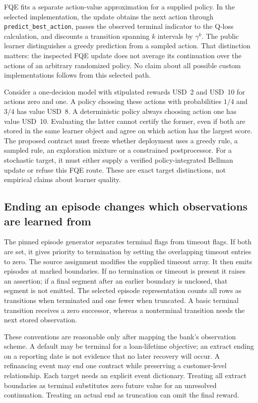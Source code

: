 FQE fits a separate action-value approximation for a supplied policy. In
the selected implementation, the update obtains the next action through
\texttt{predict_best_action}, passes the observed terminal indicator to the
Q-loss calculation, and discounts a transition spanning \(k\) intervals by
\(\gamma^k\). The public learner distinguishes a greedy prediction from a
sampled action. That distinction matters: the inspected FQE update does not
average its continuation over the actions of an arbitrary randomized policy.
No claim about all possible custom implementations follows from this selected
path. \citep{exec15_d3rlpy_value}

Consider a one-decision model with stipulated rewards USD~2 and USD~10 for
actions zero and one. A policy choosing these actions with probabilities
\(1/4\) and \(3/4\) has value USD~8. A deterministic policy always choosing
action one has value USD~10. Evaluating the latter cannot certify the former,
even if both are stored in the same learner object and agree on which action
has the largest score. The proposed contract must freeze whether deployment
uses a greedy rule, a sampled rule, an exploration mixture or a constrained
postprocessor. For a stochastic target, it must either supply a verified
policy-integrated Bellman update or refuse this FQE route. These are exact
target distinctions, not empirical claims about learner quality.
\citep{exec15_d3rlpy_exact,exec15_d3rlpy_contract}

\subsection{Ending an episode changes which observations are learned from}

The pinned episode generator separates terminal flags from timeout flags.
If both are set, it gives priority to termination by setting the overlapping
timeout entries to zero. The source assignment modifies the supplied timeout
array. It then emits episodes at marked boundaries. If no termination or
timeout is present it raises an assertion; if a final segment after an earlier
boundary is unclosed, that segment is not emitted. The selected episode
representation counts all rows as transitions when terminated and one fewer
when truncated. A basic terminal transition receives a zero successor, whereas
a nonterminal transition needs the next stored observation.
\citep{exec15_d3rlpy_episode}

These conventions are reasonable only after mapping the bank's observation
scheme. A default may be terminal for a loan-lifetime objective; an extract
ending on a reporting date is not evidence that no later recovery will occur.
A refinancing event may end one contract while preserving a customer-level
relationship. Each target needs an explicit event dictionary. Treating all
extract boundaries as terminal substitutes zero future value for an unresolved
continuation. Treating an actual end as truncation can omit the final reward.
\citep{exec15_d3rlpy_contract}


